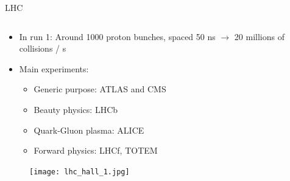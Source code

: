 \begin{frame}{LHC}
\begin{columns}
\begin{column}{.50\textwidth}
\begin{block}{}
\begin{itemize}\scriptsize
\item In run 1: Around 1000 proton bunches, spaced 50 ns $\to$ 20 millions of collisions / s
\item Main experiments:
  \begin{itemize}\tiny
  \item Generic purpose: ATLAS and CMS
  \item Beauty physics: LHCb
  \item Quark-Gluon plasma: ALICE
  \item Forward physics: LHCf, TOTEM
  \end{itemize}
\end{itemize}
\end{block}
\vspace{-.2cm}
\begin{figure}[!Hhtbp]
  \begin{center}
    \texttt{[image: lhc\_hall\_1.jpg]}
  \end{center}
\end{figure}
\end{column}
\end{columns}

\end{frame}


